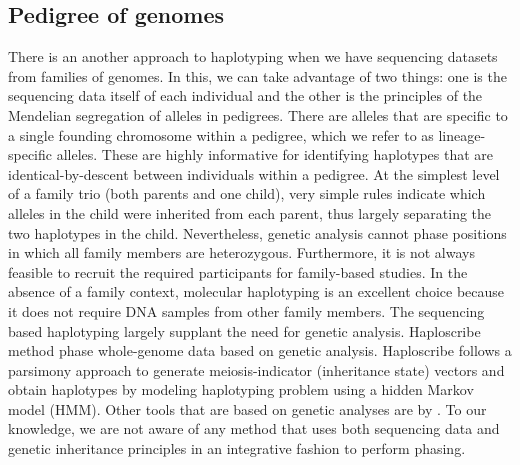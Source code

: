 \subsection{Pedigree of genomes}
There is an another approach to haplotyping when we have sequencing datasets from families of genomes.
In this, we can take advantage of two things: one is the sequencing data itself of each individual and the other is the principles of the Mendelian segregation of alleles in pedigrees. 
There are alleles that are specific to a single founding chromosome within a pedigree, which we refer to as lineage-specific alleles. These are highly informative for identifying haplotypes that are identical-by-descent between individuals within a pedigree.
At the simplest level of a family trio (both parents and one child), very simple rules indicate which alleles in the child were inherited from each parent, thus largely separating the two haplotypes in the child.  
Nevertheless, genetic analysis cannot phase positions in which all family members are heterozygous. 
Furthermore, it is not always feasible to recruit the required participants for family-based studies. 
In the absence of a family context, molecular haplotyping is an excellent choice because it does not require DNA samples from other family members. 
The sequencing based haplotyping largely supplant the need for genetic analysis.
Haploscribe~\citep{Roach2011} method phase whole-genome data based on genetic analysis. Haploscribe follows a parsimony approach to generate
meiosis-indicator (inheritance state) vectors and obtain haplotypes by modeling haplotyping problem using a hidden Markov model (HMM). 
Other tools that are based on genetic analyses are by \cite{abecasis2002merlin, williams2010rapid}.
To our knowledge, we are not aware of any method that uses both sequencing data and genetic inheritance principles in an integrative fashion to perform phasing.


